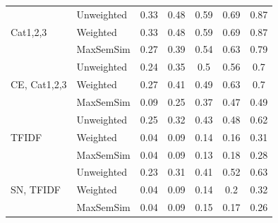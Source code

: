 \documentclass[conference]{IEEEtran}
\begin{document}
\begin{table}[!h]
\begin{tabular}{l||l|ccccc}
		\multirow{3}{*}{Cat1,2,3} & Unweighted & 0.33 & 0.48 & 0.59 & 0.69 & 0.87\\
		 & Weighted & 0.33 & 0.48 & 0.59 & 0.69 & 0.87\\
		 & MaxSemSim & 0.27 & 0.39 & 0.54 & 0.63 & 0.79\\ 
		\hline
		
		\multirow{3}{*}{CE, Cat1,2,3} & Unweighted & 0.24 & 0.35 & 0.5 & 0.56 & 0.7\\
		 & Weighted & 0.27 & 0.41 & 0.49 & 0.63 & 0.7\\
		 & MaxSemSim & 0.09 & 0.25 & 0.37 & 0.47 & 0.49\\ 
		\hline
		
		\multirow{3}{*}{TFIDF} & Unweighted & 0.25 & 0.32 & 0.43 & 0.48 & 0.62\\
		 & Weighted & 0.04 & 0.09 & 0.14 & 0.16 & 0.31\\
		 & MaxSemSim & 0.04 & 0.09 & 0.13 & 0.18 & 0.28\\ 
		\hline
		
		\multirow{3}{*}{SN, TFIDF} & Unweighted & 0.23 & 0.31 & 0.41 & 0.52 & 0.63\\
		 & Weighted & 0.04 & 0.09 & 0.14 & 0.2 & 0.32\\
		 & MaxSemSim & 0.04 & 0.09 & 0.15 & 0.17 & 0.26\\ 
		\hline		
	\end{tabular}
\end{table}		
		
\end{document}
